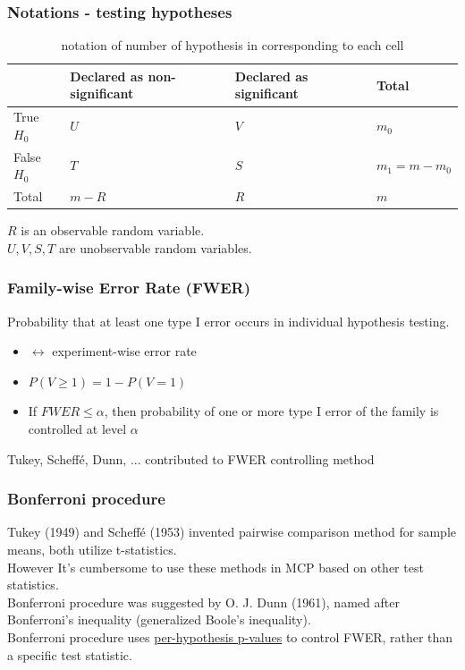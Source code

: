 \documentclass{beamer}
\begin{document}
\frame
{
  \frametitle{Notations - testing hypotheses}
    \begin{table}
    \small
    \setlength{\tabcolsep}{3pt}
\begin{tabularx}{\hsize}{@{}l LLL@{}}
    \toprule
 & Declared as non-significant  & Declared as significant & Total \\
    \midrule
True $H_0$ 
    & $U$ 
        & $V$ 
            & $m_0$ \\
False $H_0$ 
    & $T$ 
        & $S$
            &  $m_1=m-m_0$   \\
  
Total & $m-R$ 
        & $R$ 
            & $m$     \\
    \bottomrule
\end{tabularx}
\caption{notation of number of hypothesis in corresponding to each cell}
    \end{table}
    $R$ is an observable random variable.\vspace{0.1in}\\
    $U, V, S, T$ are unobservable random variables.
}


\frame
{
  \frametitle{\LARGE{Family-wise Error Rate (FWER)}}
    Probability that at least one type I error occurs in individual hypothesis testing.\vspace{0.1in}\\
    \begin{itemize}
      \item $\leftrightarrow$ experiment-wise error rate\vspace{0.1in}\\
      \item $P(V\geq1)=1-P(V=1)$\vspace{0.1in}\\
      \item If $FWER \leq \alpha$, then probability of one or more type I error of the family is controlled at level $\alpha$ \vspace{0.1in}\\
    \end{itemize}
    Tukey, Scheff\'e, Dunn, $...$ contributed to FWER controlling method
}

\frame
{
  \frametitle{Bonferroni procedure}
    Tukey (1949) and Scheff\'e (1953) invented pairwise comparison method for sample means, both utilize t-statistics.\vspace{0.07in}\\
    However It's cumbersome to use these methods in MCP based on other test statistics.\vspace{0.22in}\\
    Bonferroni procedure was suggested by O. J. Dunn (1961), named after Bonferroni's inequality (generalized Boole's inequality).\vspace{0.07in}\\
Bonferroni procedure uses \underline{per-hypothesis p-values} to control FWER, rather than a specific test statistic.
}
\end{document}
